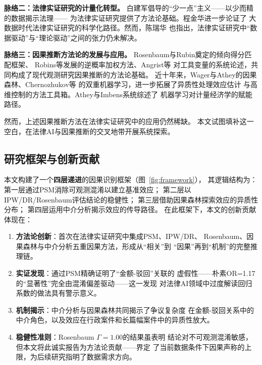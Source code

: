 \documentclass[12pt,a4paper,twoside]{ctexart}
\newcommand{\figref}[1]{图~\ref{fig:#1}}
\begin{document}
\textbf{脉络二：法律实证研究的计量化转型。}
白建军\cite{bai2017}倡导的``少一点''主义——以少而精的数据揭示法理——
为法律实证研究提供了方法论基础。程金华\cite{cheng2019}进一步论证了
大数据时代法律实证研究的科学化路径。然而，陈瑞华\cite{chenruihua2015}
也指出，法律实证研究中``数据驱动''与``理论驱动''之间的张力仍未解决。

\textbf{脉络三：因果推断方法论的发展与应用。}
Rosenbaum与Rubin\cite{rosenbaum1983}奠定的倾向得分匹配框架、
Robins等\cite{robins1994}发展的逆概率加权方法、Angrist等\cite{angrist1996}
对工具变量的系统论述，共同构成了现代观测研究因果推断的方法论基础。
近十年来，Wager与Athey\cite{wager2018}的因果森林、Chernozhukov等
\cite{chernozhukov2018}的双重机器学习，进一步拓展了异质性处理效应估计
与高维控制的方法工具箱。Athey与Imbens\cite{athey2019}系统综述了
机器学习对计量经济学的赋能路径。

然而，上述因果推断方法在法律实证研究中的应用仍然稀缺。
本文试图填补这一空白，在法律AI与因果推断的交叉地带开展系统探索。

\subsection{研究框架与创新贡献}

本文构建了一个\textbf{四层递进}的因果识别框架（\figref{framework}），
其逻辑结构为：第一层通过PSM消除可观测混淆以建立基准效应；
第二层以IPW/DR/Rosenbaum评估结论的稳健性；
第三层借助因果森林探索效应的异质性分布；
第四层运用中介分析揭示效应的传导路径。
在此框架下，本文的创新贡献体现在：

\begin{enumerate}[label=(\arabic*),leftmargin=*]
    \item \textbf{方法论创新}：首次在法律实证研究中集成PSM、IPW/DR、
    Rosenbaum、因果森林与中介分析五重因果方法，形成从``相关''到
    ``因果''再到``机制''的完整推理链。
    \item \textbf{实证发现}：通过PSM精确证明了``金额-驳回''关联的
    虚假性——朴素OR=1.17的``显著性''完全由混淆偏差驱动——这一发现
    对法律AI领域中过度解读回归系数的做法具有警示意义。
    \item \textbf{机制揭示}：中介分析与因果森林共同揭示了争议复杂度
    在金额-驳回关系中的中介角色，以及效应在行政案件和长篇幅案件中的异质性放大。
    \item \textbf{稳健性准则}：Rosenbaum $\Gamma=1.00$的结果虽表明
    结论对不可观测混淆敏感，但本文将此诚实报告为方法论贡献——界定
    了当前数据条件下因果声称的上限，为后续研究指明了数据需求方向。
\end{enumerate}
\end{document}
